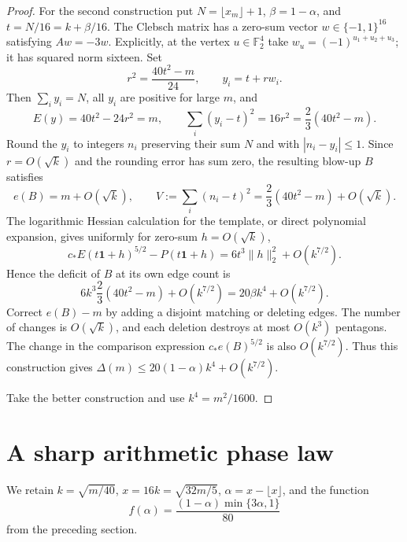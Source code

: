 \begin{proof}
For the second construction put $N=\lfloor x_m\rfloor+1$,
$\beta=1-\alpha$, and $t=N/16=k+\beta/16$. The Clebsch matrix has a
zero-sum vector $w\in\{-1,1\}^{16}$ satisfying $Aw=-3w$. Explicitly, at
the vertex $u\in\mathbb F_2^4$ take $w_u=(-1)^{u_1+u_2+u_3}$; it has
squared norm sixteen. Set
\[
 r^2=\frac{40t^2-m}{24},\qquad y_i=t+rw_i.
\]
Then $\sum_i y_i=N$, all $y_i$ are positive for large $m$, and
\[
 E(y)=40t^2-24r^2=m,\qquad
 \sum_i(y_i-t)^2=16r^2=\frac23(40t^2-m).
\]
Round the $y_i$ to integers $n_i$ preserving their sum $N$ and with
$|n_i-y_i|\leq1$. Since $r=O(\sqrt{k})$ and the rounding error has sum
zero, the resulting blow-up $B$ satisfies
\[
 e(B)=m+O(\sqrt{k}),\qquad
 V:=\sum_i(n_i-t)^2=\frac23(40t^2-m)+O(\sqrt{k}).
\]
The logarithmic Hessian calculation for the template, or direct
polynomial expansion, gives uniformly for zero-sum $h=O(\sqrt{k})$,
\[
 c_\ast E(t\mathbf1+h)^{5/2}-P(t\mathbf1+h)
   =6t^3\lVert h\rVert_2^2+O(k^{7/2}).
\]
Hence the deficit of $B$ at its own edge count is
\[
 6k^3\frac23(40t^2-m)+O(k^{7/2})
   =20\beta k^4+O(k^{7/2}).
\]
Correct $e(B)-m$ by adding a disjoint matching or deleting edges. The
number of changes is $O(\sqrt{k})$, and each deletion destroys at most
$O(k^3)$ pentagons. The change in the comparison expression
$c_\ast e(B)^{5/2}$ is also $O(k^{7/2})$. Thus this construction gives
$\Delta(m)\leq20(1-\alpha)k^4+O(k^{7/2})$.

Take the better construction and use $k^4=m^2/1600$.
\end{proof}

\section{A sharp arithmetic phase law}\label{sec:phase-law}

We retain $k=\sqrt{m/40}$, $x=16k=\sqrt{32m/5}$,
$\alpha=x-\lfloor x\rfloor$, and the function
\[
 f(\alpha)=\frac{(1-\alpha)\min\{3\alpha,1\}}{80}
\]
from the preceding section.

